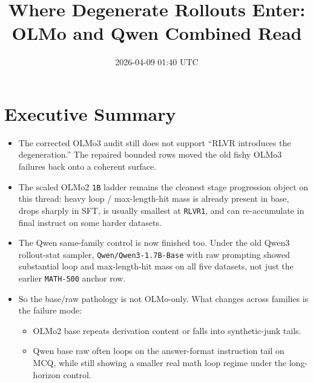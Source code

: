 \documentclass[11pt]{article}
\title{Where Degenerate Rollouts Enter: OLMo and Qwen Combined Read}
\author{}
\date{2026-04-09 01:40 UTC}
\begin{document}
\maketitle

\section*{Executive Summary}
\begin{itemize}[leftmargin=1.5em]
\item The corrected OLMo3 audit still does not support ``RLVR introduces the degeneration.'' The repaired bounded rows moved the old fishy OLMo3 failures back onto a coherent surface.
\item The scaled OLMo2 \texttt{1B} ladder remains the cleanest stage progression object on this thread: heavy loop / max-length-hit mass is already present in base, drops sharply in SFT, is usually smallest at \texttt{RLVR1}, and can re-accumulate in final instruct on some harder datasets.
\item The Qwen same-family control is now finished too. Under the old Qwen3 rollout-stat sampler, \texttt{Qwen/Qwen3-1.7B-Base} with raw prompting showed substantial loop and max-length-hit mass on all five datasets, not just the earlier \texttt{MATH-500} anchor row.
\item So the base/raw pathology is not OLMo-only. What changes across families is the failure mode:
\begin{itemize}[leftmargin=1.5em]
\item OLMo2 base repeats derivation content or falls into synthetic-junk tails.
\item Qwen base raw often loops on the answer-format instruction tail on MCQ, while still showing a smaller real math loop regime under the long-horizon control.
\end{itemize}
\end{itemize}
\end{document}
